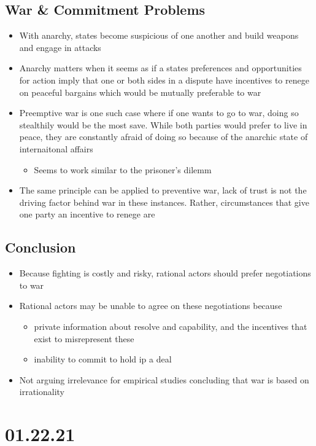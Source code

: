 \documentclass[11pt]{article}
\begin{document}
\subsection{War \& Commitment Problems}
\label{sec:org7d7998c}
\begin{itemize}
\item With anarchy, states become suspicious of one another and build weapons and engage in attacks
\item Anarchy matters when it seems as if a states preferences and opportunities for action imply that one or both sides in a dispute have incentives to renege on peaceful bargains which would be mutually preferable to war
\item Preemptive war is one such case where if one wants to go to war, doing so stealthily would be the most save. While both parties would prefer to live in peace, they are constantly afraid of doing so because of the anarchic state of internaitonal affairs
\begin{itemize}
\item Seems to work similar to the prisoner's dilemm
\end{itemize}
\item The same principle can be applied to preventive war, lack of trust is not the driving factor behind war in these instances. Rather, circumstances that give one party an incentive to renege are
\end{itemize}
\subsection{Conclusion}
\label{sec:org6182b45}
\begin{itemize}
\item Because fighting is costly and risky, rational actors should prefer negotiations to war
\item Rational actors may be unable to agree on these negotiations because
\begin{itemize}
\item private information about resolve and capability, and the incentives that exist to misrepresent these
\item inability to commit to hold ip a deal
\end{itemize}
\item Not arguing irrelevance for empirical studies concluding that war is based on irrationality
\end{itemize}
\section{01.22.21}
\label{sec:org61d591d}
\end{document}
